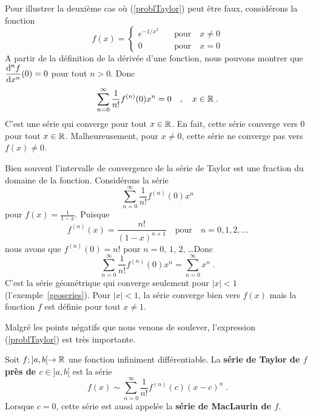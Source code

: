 {\begin{egg}
Pour illustrer la deuxième cas où (\ref{problTaylor}) peut être faux,
considérons la fonction
\[
f(x) = \begin{cases}
e^{-1/x^2} & \quad \text{pour} \quad x\neq 0 \\
0 & \quad \text{pour}\quad x = 0
\end{cases}
\]
A partir de la définition de la dérivée d'une fonction, nous pouvons montrer que
$\displaystyle \frac{\mathrm{d}^{n}f}{\mathrm{d}x^{n}}(0) = 0$ pour tout $n>0$.
Donc
\[
\sum_{n=0}^\infty \frac{1}{n!} f^{(n)}(0)x^n = 0 \quad , \quad
x \in \mathbb{R} \; .
\]
C'est une série qui converge pour tout $x\in \mathbb{R}$.  En fait, cette série
converge vers $0$ pour tout $x\in \mathbb{R}$.  Malheureusement, pour
$x \neq 0$, cette série ne converge pas vers $f(x) \neq 0$.
\end{egg}



\begin{egg}
Bien souvent l'intervalle de convergence de la série de Taylor est une
fraction du domaine de la fonction.  Considérons la série
\[
\sum_{n=0}^\infty \frac{1}{n!} f^{(n)}(0)x^n
\]
pour $\displaystyle f(x) = \frac{1}{1-x}$.  Puisque
\[
f^{(n)}(x) = \frac{n!}{(1-x)^{n+1}} \quad \text{pour} \quad n=0, 1, 2,
\ldots
\]
nous avons que $\displaystyle f^{(n)}(0) = n!$ pour $n=0$, $1$, $2$,
\ldots\quad  Donc
\[
\sum_{n=0}^\infty \frac{1}{n!} f^{(n)}(0)x^n = \sum_{n=0}^\infty x^n
\; .
\]
C'est la série géométrique qui converge seulement pour $|x| <1$
(l'exemple~\ref{geoseries}).  Pour $|x|< 1$, la série converge bien
vers $f(x)$ mais la fonction $f$ est définie pour tout $x\neq 1$.
\label{eggtaylorgeom}
\end{egg}

Malgré les points négatifs que nous venons de soulever, l'expression
(\ref{problTaylor}) est très importante.

\begin{focus}{\dfn} 
Soit $f;]a,b[\rightarrow \mathbb{R}$ une fonction infiniment différentiable.  La
{\bfseries série de Taylor de $f$ près de $c \in ]a,b[$} est la série
\begin{equation}\label{TaylorSeries}
f(x) \sim \sum_{n=0}^\infty \frac{1}{n!} f^{(n)}(c)(x-c)^n \; .
\end{equation}
Lorsque $c=0$, cette série est aussi appelée la
{\bfseries série de MacLaurin de $f$}.


\end{focus}}
